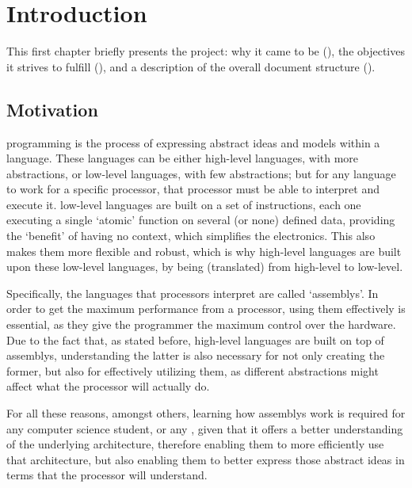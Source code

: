 \chapter{Introduction}\label{chap:introduction}
This first chapter briefly presents the project: why it came to be (), the objectives it strives to fulfill (), and a description of the overall document structure ().


\section{Motivation}\label{sec:motivation}
\Gls{programming} is the process of expressing abstract ideas and models within a language. These languages can be either \glspl{high-level language}, with more abstractions, or \glspl{low-level language}, with few abstractions; but for any language to work for a specific \gls{processor}, that \gls{processor} must be able to interpret and execute it. \Glspl{low-level language} are built on a set of instructions, each one executing a single `atomic' function on several (or none) defined data, providing the `benefit' of having no context, which simplifies the electronics. This also makes them more flexible and robust, which is why \glspl{high-level language} are built upon these \glspl{low-level language}, by being  (translated) from high-level to low-level.

Specifically, the languages that processors interpret  are called `\glspl{assembly}'. In order to get the maximum performance from a \gls{processor}, using them effectively is essential, as they give the \gls{programmer} the maximum control over the hardware. Due to the fact that, as stated before, \glspl{high-level language} are built on top of \glspl{assembly}, understanding the latter is also necessary for not only creating the former, but also for effectively utilizing them, as different abstractions might affect what the \gls{processor} will actually do.

For all these reasons, amongst others, learning how \glspl{assembly} work is required for any \gls{computer science} student, or any , given that it offers a better understanding of the underlying architecture, therefore enabling them to more efficiently use that architecture, but also enabling them to better express those abstract ideas in terms that the \gls{processor} will understand.

